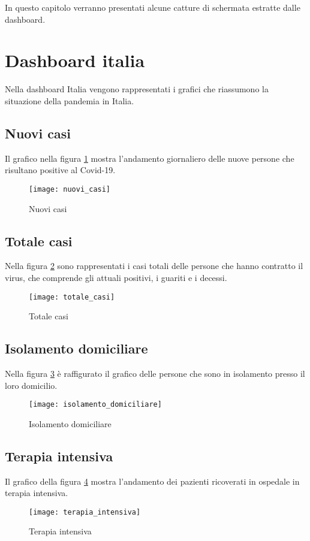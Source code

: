 
\noindent In questo capitolo verranno presentati alcune catture di schermata estratte dalle dashboard.

\section{Dashboard italia}
Nella dashboard Italia vengono rappresentati i grafici che riassumono la situazione della pandemia in Italia.

\subsection{Nuovi casi}
Il grafico nella figura \ref{fig:nuovi_casi} mostra l'andamento giornaliero delle nuove persone che risultano positive  al Covid-19.
\begin{figure}[htp]
    \centering
    \texttt{[image: nuovi\_casi]}
    \caption{Nuovi casi}
    \label{fig:nuovi_casi}
\end{figure}

\subsection{Totale casi}
Nella figura \ref{fig:totale_casi} sono rappresentati i casi totali delle persone che hanno contratto il virus, che comprende gli attuali positivi, i guariti e i decessi.
\begin{figure}[htp]
    \centering
    \texttt{[image: totale\_casi]}
    \caption{Totale casi}
    \label{fig:totale_casi}
\end{figure}

\subsection{Isolamento domiciliare}
Nella figura \ref{fig:isolamento_domiciliare} è raffigurato il grafico delle persone che sono in isolamento presso il loro domicilio.
\begin{figure}[htp]
    \centering
    \texttt{[image: isolamento\_domiciliare]}
    \caption{Isolamento domiciliare}
    \label{fig:isolamento_domiciliare}
\end{figure}

\subsection{Terapia intensiva}
Il grafico della figura \ref{fig:terapia_intensiva} mostra l'andamento dei pazienti ricoverati in ospedale in terapia intensiva.
\begin{figure}[htp]
    \centering
    \texttt{[image: terapia\_intensiva]}
    \caption{Terapia intensiva}
    \label{fig:terapia_intensiva}
\end{figure}

